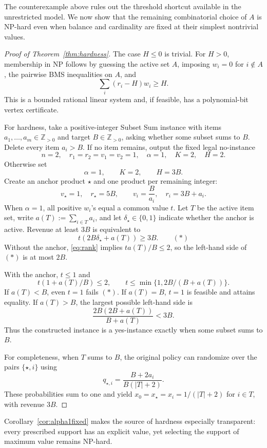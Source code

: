 \documentclass[11pt]{article}
\begin{document}
The counterexample above rules out the threshold shortcut available in the unrestricted model. We now show that the remaining combinatorial choice of $A$ is NP-hard even when balance and cardinality are fixed at their simplest nontrivial values.
\begin{proof}[Proof of Theorem~\ref{thm:hardness}]
The case $H\le0$ is trivial. For $H>0$, membership in NP follows by guessing the active set $A$, imposing $w_i=0$ for $i\notin A$, the pairwise BMS inequalities on $A$, and
\[
 \sum_i(r_i-H)w_i\ge H.
\]
This is a bounded rational linear system and, if feasible, has a polynomial-bit vertex certificate.

For hardness, take a positive-integer Subset Sum instance with items $a_1,\ldots,a_m\in\mathbb Z_{>0}$ and target $B\in\mathbb Z_{>0}$, asking whether some subset sums to $B$. Delete every item $a_i>B$. If no item remains, output the fixed legal no-instance
\[
 n=2,\quad r_1=r_2=v_1=v_2=1,\quad \alpha=1,\quad K=2,\quad H=2.
\]
Otherwise set
\[
 \alpha=1,\qquad K=2,\qquad H=3B.
\]
Create an anchor product $\star$ and one product per remaining integer:
\[
 v_\star=1,\quad r_\star=5B,\qquad v_i=\frac{B}{a_i},\quad r_i=3B+a_i.
\]
When $\alpha=1$, all positive $w_i$'s equal a common value $t$. Let $T$ be the active item set, write $a(T):=\sum_{i\in T}a_i$, and let $\delta_\star\in\{0,1\}$ indicate whether the anchor is active. Revenue at least $3B$ is equivalent to
\begin{equation*}
 t(2B\delta_\star+a(T))\ge3B.\qquad(\ast)
\end{equation*}
Without the anchor, \eqref{eq:rank} implies $t a(T)/B\le2$, so the left-hand side of $(\ast)$ is at most $2B$.

With the anchor, $t\le1$ and
\[
 t(1+a(T)/B)\le2,\qquad t\le\min\{1,2B/(B+a(T))\}.
\]
If $a(T)<B$, even $t=1$ fails $(\ast)$. If $a(T)=B$, $t=1$ is feasible and attains equality. If $a(T)>B$, the largest possible left-hand side is
\[
 \frac{2B(2B+a(T))}{B+a(T)}<3B.
\]
Thus the constructed instance is a yes-instance exactly when some subset sums to $B$.

For completeness, when $T$ sums to $B$, the original policy can randomize over the pairs $\{\star,i\}$ using
\[
 q_{\star,i}=\frac{B+2a_i}{B(|T|+2)}.
\]
These probabilities sum to one and yield $x_0=x_\star=x_i=1/(|T|+2)$ for $i\in T$, with revenue $3B$.
\end{proof}

Corollary~\ref{cor:alpha1fixed} makes the source of hardness especially transparent: every prescribed support has an explicit value, yet selecting the support of maximum value remains NP-hard.
\end{document}

